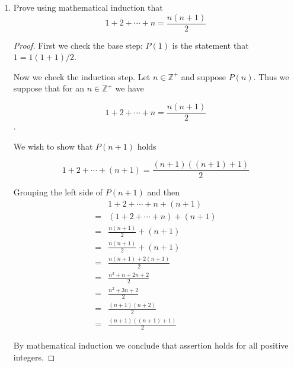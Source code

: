 \documentclass[12pt]{article}
\begin{document}
\begin{enumerate}
\begin{proof}
			Let $x\in f^{-1}(A\cap B)$. Then $x\in \{a\in\mathbb{R}:f(a)\in A\cap B \}$. Hence, $x=a$ where $f(a)\in A\cap B$. In other words, $f(a)\in A$ and $f(a)\in B$. Thus $x\in f^{-1}(A)$ and $x\in f^{-1}(B)$, hence $x\in f^{-1}(A)\cap f^{-1}(B)$.
			
			Now let $x\in f^{-1}(A)\cap f^{-1}(B)$. Thus $x\in f^{-1}(A)$ and $x\in f^{-1}(B)$. Then $x\in \{a\in\mathbb{R}:f(a)\in A \}$ and $x\in \{b\in\mathbb{R}:f(b)\in B \}$. Therefore $x\in \{a\in\mathbb{R}:f(a)\in A\cap B \}$. Hence $x\in f^{-1}(A\cap B)$.
			
			Since containment was proved in both directions, hence equivalence is proven.
		\end{proof}
		
		\newpage
			
		\item Prove using mathematical induction that
		\[
		1+2+\dotsm+n=\frac{n(n+1)}{2}
		\]
		
		\begin{proof}
			First we check the base step: $P(1)$ is the statement that $1=1(1+1)/2$.
			
			Now we check the induction step. Let $n\in\mathbb{Z}^+$ and suppose $P(n)$. Thus we suppose that for an $n\in\mathbb{Z}^+$ we have
			
			\[
			1+2+\dotsm+n=\frac{n(n+1)}{2}
			\].
			
			We wish to show that $P(n+1)$ holds
			
			\[
			1+2+\dotsm+(n+1)=\frac{(n+1)((n+1)+1)}{2}
			\]
			
			Grouping the left side of $P(n+1)$ and then
			\begin{align*}
			&1+2+\dotsm+n+(n+1)\\
			=&(1+2+\dotsm+n)+(n+1)\\
			=&\frac{n(n+1)}{2}+(n+1)\\
			=&\frac{n(n+1)}{2}+(n+1)\\
			=&\frac{n(n+1)+2(n+1)}{2}\\
			=&\frac{n^2+n+2n+2}{2}\\
			=&\frac{n^2+3n+2}{2}\\
			=&\frac{(n+1)(n+2)}{2}\\
			=&\frac{(n+1)((n+1)+1)}{2}
			\end{align*}
			
			By mathematical induction we conclude that assertion holds for all positive integers.
		\end{proof}
		
		\newpage
		

\end{enumerate}
\end{document}

